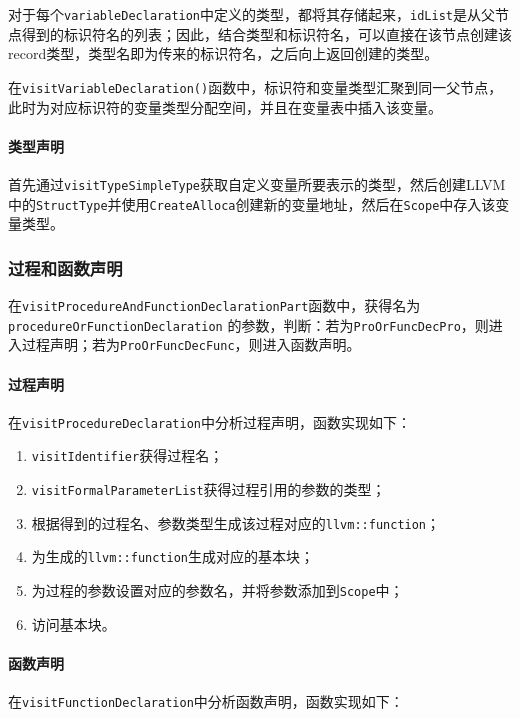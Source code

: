 \documentclass[lang=cn,11pt,a4paper,cite=authornum]{paper}
\begin{document}
对于每个\texttt{variableDeclaration}中定义的类型，都将其存储起来，\texttt{idList}是从父节点得到的标识符名的列表；因此，结合类型和标识符名，可以直接在该节点创建该record类型，类型名即为传来的标识符名，之后向上返回创建的类型。

在\texttt{visitVariableDeclaration()}函数中，标识符和变量类型汇聚到同一父节点，此时为对应标识符的变量类型分配空间，并且在变量表中插入该变量。

\paragraph{类型声明}

首先通过\texttt{visitTypeSimpleType}获取自定义变量所要表示的类型，然后创建LLVM中的\texttt{StructType}并使用\texttt{CreateAlloca}创建新的变量地址，然后在\texttt{Scope}中存入该变量类型。

\subsubsection{过程和函数声明}

在\texttt{visitProcedureAndFunctionDeclarationPart}函数中，获得名为 \texttt{procedureOrFunctionDeclaration} 的参数，判断：若为\texttt{ProOrFuncDecPro}，则进入过程声明；若为\texttt{ProOrFuncDecFunc}，则进入函数声明。

\paragraph{过程声明} 在\texttt{visitProcedureDeclaration}中分析过程声明，函数实现如下：

\begin{enumerate}
    \item \texttt{visitIdentifier}获得过程名；
    \item \texttt{visitFormalParameterList}获得过程引用的参数的类型；
    \item 根据得到的过程名、参数类型生成该过程对应的\texttt{llvm::function}；
    \item 为生成的\texttt{llvm::function}生成对应的基本块；
    \item 为过程的参数设置对应的参数名，并将参数添加到\texttt{Scope}中；
    \item 访问基本块。
\end{enumerate}

\paragraph{函数声明} 在\texttt{visitFunctionDeclaration}中分析函数声明，函数实现如下：
\end{document}
